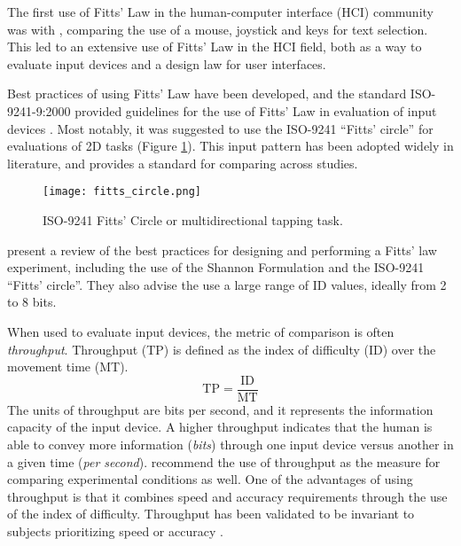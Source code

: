 The first use of Fitts' Law in the human-computer interface (HCI) community was with \citet{card_evaluation_1978}, comparing the use of a mouse, joystick and keys for text selection.
This led to an extensive use of Fitts' Law in the HCI field, both as a way to evaluate input devices and a design law for user interfaces.

Best practices of using Fitts' Law have been developed, and the standard ISO-9241-9:2000 provided guidelines for the use of Fitts' Law in evaluation of input devices \citep{international_organization_for_standardization_iso_2000}.
Most notably, it was suggested to use the ISO-9241 ``Fitts' circle'' for evaluations of 2D tasks (Figure \ref{fig:intro_fitts_circle}).
This input pattern has been adopted widely in literature, and provides a standard for comparing across studies.

\begin{figure}
    \centering
    \texttt{[image: fitts\_circle.png]}
    \caption{ISO-9241 Fitts' Circle or multidirectional tapping task.}
    \label{fig:intro_fitts_circle}
\end{figure}

\citet{soukoreff_towards_2004} present a review of the best practices for designing and performing a Fitts' law experiment, including the use of the Shannon Formulation and the ISO-9241 ``Fitts' circle''.
They also advise the use a large range of ID values, ideally from 2 to 8 bits.


When used to evaluate input devices, the metric of comparison is often \emph{throughput}.
Throughput (TP) is defined as the index of difficulty (ID) over the movement time (MT).
\begin{equation}
    \mathrm{TP} = \frac{\text{ID}}{\text{MT}}
\end{equation}
The units of throughput are bits per second, and it represents the information capacity of the input device.
A higher throughput indicates that the human is able to convey more information (\emph{bits}) through one input device versus another in a given time (\emph{per second}).
\citet{soukoreff_towards_2004} recommend the use of throughput as the measure for comparing experimental conditions as well.
One of the advantages of using throughput is that it combines speed and accuracy requirements through the use of the index of difficulty.
Throughput has been validated to be invariant to subjects prioritizing speed or accuracy \citep{mackenzie_fitts_2008}.

